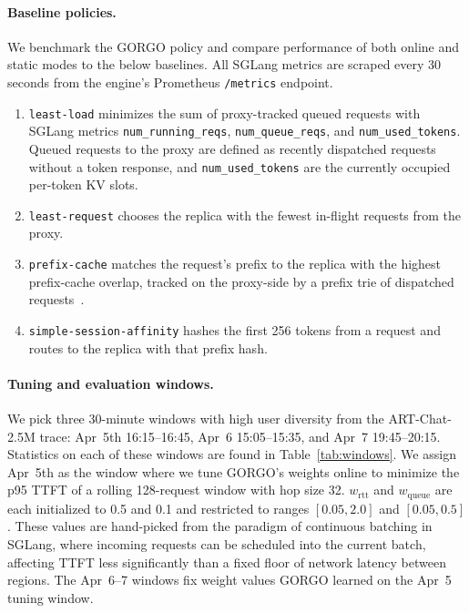 \documentclass{article}
\begin{document}
\paragraph{Baseline policies.}
We benchmark the GORGO policy and compare performance of both online and static
modes to the below baselines. All SGLang metrics are scraped every 30 seconds
from the engine's Prometheus \texttt{/metrics} endpoint.
\begin{enumerate}
\item \texttt{least-load} minimizes the sum of proxy-tracked queued requests with
  SGLang metrics \texttt{num\_running\_reqs}, \texttt{num\_queue\_reqs}, and
  \texttt{num\_used\_tokens}. Queued requests to the proxy are defined as recently
  dispatched requests without a token response, and \texttt{num\_used\_tokens} are
  the currently occupied per-token KV slots.
\item \texttt{least-request} chooses the replica with the fewest in-flight
  requests from the proxy.
\item \texttt{prefix-cache} matches the request's prefix to the replica with the
  highest prefix-cache overlap, tracked on the proxy-side by a prefix trie of
  dispatched requests~\citep{aibrix2024}.
\item \texttt{simple-session-affinity} hashes the first 256 tokens from a request
  and routes to the replica with that prefix hash.
\end{enumerate}

\paragraph{Tuning and evaluation windows.}
We pick three 30-minute windows with high user diversity from the ART-Chat-2.5M
trace: Apr~5th 16:15--16:45, Apr~6 15:05--15:35, and Apr~7 19:45--20:15.
Statistics on each of these windows are found in Table~\ref{tab:windows}. We
assign Apr~5th as the window where we tune GORGO's weights online to minimize the
p95 TTFT of a rolling 128-request window with hop size 32. $w_{\mathrm{rtt}}$ and
$w_{\mathrm{queue}}$ are each initialized to 0.5 and 0.1 and restricted to ranges
$[0.05, 2.0]$ and $[0.05, 0.5]$. These values are hand-picked from the paradigm
of continuous batching in SGLang, where incoming requests can be scheduled into
the current batch, affecting TTFT less significantly than a fixed floor of
network latency between regions. The Apr~6--7 windows fix weight values GORGO
learned on the Apr~5 tuning window.

\FloatBarrier
\end{document}
